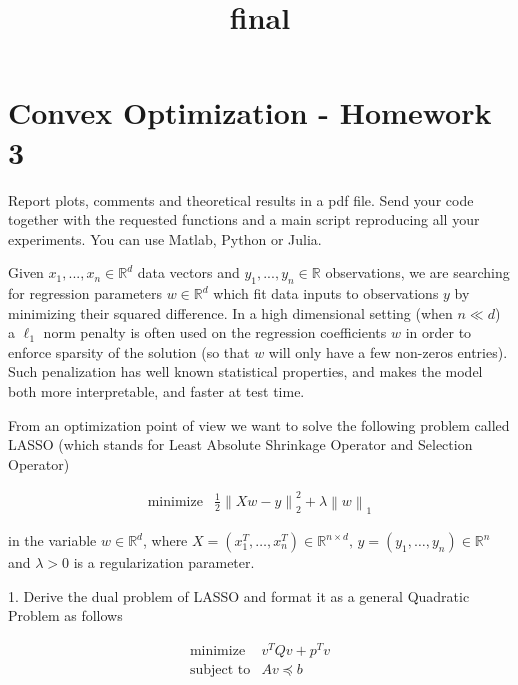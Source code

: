 \documentclass[11pt]{article}
\title{final}
\begin{document}
    
    \maketitle
    
    

    
    \hypertarget{convex-optimization---homework-3}{%
\section{Convex Optimization - Homework
3}\label{convex-optimization---homework-3}}

Report plots, comments and theoretical results in a pdf file. Send your
code together with the requested functions and a main script reproducing
all your experiments. You can use Matlab, Python or Julia.

Given \(x_1,...,x_n \in \mathbb{R}^d\) data vectors and
\(y_1,...,y_n \in \mathbb{R}\) observations, we are searching for
regression parameters \(w \in \mathbb{R}^d\) which fit data inputs to
observations \(y\) by minimizing their squared difference. In a high
dimensional setting (when \(n \ll d\)) a \(\ell_1\) norm penalty is
often used on the regression coefficients \(w\) in order to enforce
sparsity of the solution (so that \(w\) will only have a few non-zeros
entries). Such penalization has well known statistical properties, and
makes the model both more interpretable, and faster at test time.

From an optimization point of view we want to solve the following
problem called LASSO (which stands for Least Absolute Shrinkage Operator
and Selection Operator)

\begin{equation}
\tag{LASSO}
\begin{array}{ll}
\text{minimize} & \frac{1}{2} \left\lVert Xw - y \right\rVert^2_2 + \lambda \left\lVert w \right\rVert_1
\end{array}
\end{equation}

in the variable \(w \in \mathbb{R}^d\), where
\(X = (x^T_1, \ldots, x^T_n) \in \mathbb{R}^{n\times d},\, y = (y_1, \ldots, y_n) \in \mathbb{R}^n\)
and \(\lambda > 0\) is a regularization parameter.

    1. Derive the dual problem of LASSO and format it as a general Quadratic
Problem as follows

\begin{equation}
\tag{QP}
\begin{array}{ll}
\text{minimize} & v^TQv + p^Tv \\
\text{subject to} & Av \preceq b
\end{array}
\end{equation}
\end{document}
